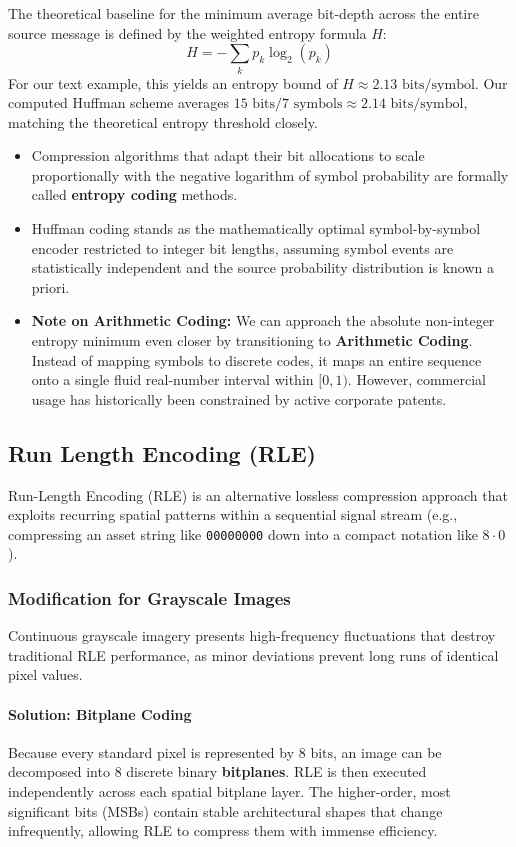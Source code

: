 \documentclass{article}
\begin{document}
The theoretical baseline for the minimum average bit-depth across the entire source message is defined by the weighted entropy formula $H$:
\[
H = -\sum_{k} p_k \log_2(p_k)
\]
For our text example, this yields an entropy bound of $H \approx 2.13\text{ bits/symbol}$. Our computed Huffman scheme averages $15\text{ bits} / 7\text{ symbols} \approx 2.14\text{ bits/symbol}$, matching the theoretical entropy threshold closely.

\begin{itemize}
  \item Compression algorithms that adapt their bit allocations to scale proportionally with the negative logarithm of symbol probability are formally called \textbf{entropy coding} methods.
  \item Huffman coding stands as the mathematically optimal symbol-by-symbol encoder restricted to integer bit lengths, assuming symbol events are statistically independent and the source probability distribution is known a priori.
  \item \textbf{Note on Arithmetic Coding:} We can approach the absolute non-integer entropy minimum even closer by transitioning to \textbf{Arithmetic Coding}. Instead of mapping symbols to discrete codes, it maps an entire sequence onto a single fluid real-number interval within $[0,1)$. However, commercial usage has historically been constrained by active corporate patents.
\end{itemize}

\subsection{Run Length Encoding (RLE)}
Run-Length Encoding (RLE) is an alternative lossless compression approach that exploits recurring spatial patterns within a sequential signal stream (e.g., compressing an asset string like \texttt{00000000} down into a compact notation like $8 \cdot 0$).

\subsubsection{Modification for Grayscale Images}
Continuous grayscale imagery presents high-frequency fluctuations that destroy traditional RLE performance, as minor deviations prevent long runs of identical pixel values.

\paragraph{Solution: Bitplane Coding}
Because every standard pixel is represented by $8\text{ bits}$, an image can be decomposed into $8$ discrete binary \textbf{bitplanes}. RLE is then executed independently across each spatial bitplane layer. The higher-order, most significant bits (MSBs) contain stable architectural shapes that change infrequently, allowing RLE to compress them with immense efficiency.
\end{document}
